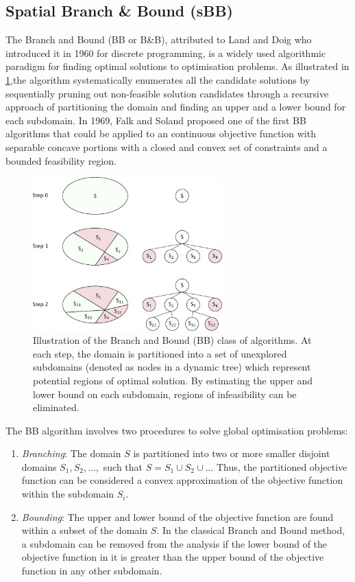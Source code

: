 	\subsection{Spatial Branch \& Bound (sBB)}
		The Branch and Bound (BB or B\&B), attributed to Land and Doig \cite{Land:1960aa} who introduced it in 1960 for discrete programming, is a widely used algorithmic paradigm for finding optimal solutions to optimisation problems. As illustrated in \ref{fig:BB},the algorithm systematically enumerates all the candidate solutions by sequentially pruning out non-feasible solution candidates through a recursive approach of partitioning the domain and finding an upper and a lower bound for each subdomain. In 1969, Falk and Soland \cite{Falk69} proposed one of the first BB algorithms that could be applied to an continuous objective function with separable concave portions with a closed and convex set of constraints and a bounded feasibility region.
		\begin{figure}[htbp]
		\centering
		\includegraphics[width=0.65\textwidth]{figures/chapter-6/BB.pdf}
		\caption[Illustration of Branch and Bound (BB) class of algorithms.]{Illustration of the Branch and Bound (BB) class of algorithms. At each step, the domain is partitioned into a set of unexplored subdomains (denoted as nodes in a dynamic tree) which represent potential regions of optimal solution. By estimating the upper and lower bound on each subdomain, regions of infeasibility can be eliminated.}
		\label{fig:BB}
	\end{figure}
The BB algorithm involves two procedures to solve global optimisation problems:
	\begin{enumerate}
		\item \emph{Branching}: The domain $S$ is partitioned into two or more smaller disjoint domains $S_1,S_2,\dots,$ such that $S = S_1 \cup S_2 \cup \dots$ Thus, the partitioned objective function can be considered a convex approximation of the objective function within the subdomain $S_i$.
		\item \emph{Bounding}: The upper and lower bound of the objective function are found within a subset of the domain $S$. In the classical Branch and Bound method, a subdomain can be removed from the analysis if the lower bound of the objective function in it is greater than the upper bound of the objective function in any other subdomain.
	\end{enumerate}
